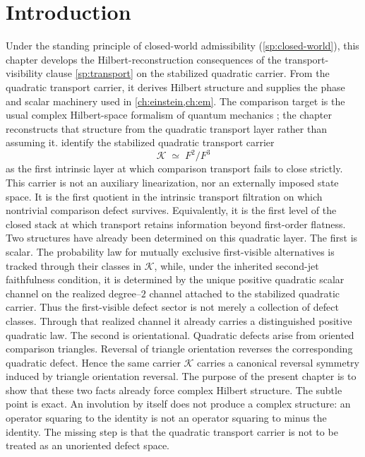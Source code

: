 \section{Introduction}
Under the standing principle of closed-world admissibility
(\cref{sp:closed-world}), this chapter develops the Hilbert-reconstruction
consequences of the transport-visibility clause \cref{sp:transport} on
the stabilized quadratic carrier.
From the quadratic transport carrier, it derives Hilbert structure and
supplies the phase and scalar machinery used in
\cref{ch:einstein,ch:em}.
The comparison target is the usual complex Hilbert-space formalism of
quantum mechanics \cite{VonNeumann1955}; the chapter reconstructs that
structure from the quadratic transport layer rather than assuming it.
 identify the
stabilized quadratic transport
carrier
\[
	\mathcal K \;\simeq\; F^{2}/F^{3}
\]
as the first intrinsic layer at which comparison transport fails to
close strictly.
This carrier is not an auxiliary linearization, nor an externally
imposed state space.
It is the first quotient in the intrinsic transport filtration on which
nontrivial comparison defect survives.
Equivalently, it is the first level of the closed stack at which
transport retains information beyond first-order flatness.
Two structures have already been determined on this quadratic layer.
The first is scalar.
The probability law for mutually exclusive first-visible alternatives is
tracked through their classes in \(\mathcal K\), while, under the
inherited second-jet faithfulness condition, it is determined by the
unique positive quadratic scalar channel on the realized degree--\(2\)
channel attached to the stabilized quadratic carrier.  Thus the
first-visible defect sector is not merely a collection of defect
classes.  Through that realized channel it already carries a
distinguished positive quadratic law.
The second is orientational.
Quadratic defects arise from oriented comparison triangles.
Reversal of triangle orientation reverses the corresponding quadratic
defect.
Hence the same carrier \(\mathcal K\) carries a canonical reversal
symmetry induced by triangle orientation reversal.
The purpose of the present chapter is to show that these two facts
already force complex Hilbert structure.
The subtle point is exact.
An involution by itself does not produce a complex structure:
an operator squaring to the identity is not an operator squaring to
minus the identity.
The missing step is that the quadratic transport carrier is not to be
treated as an unoriented defect space.
